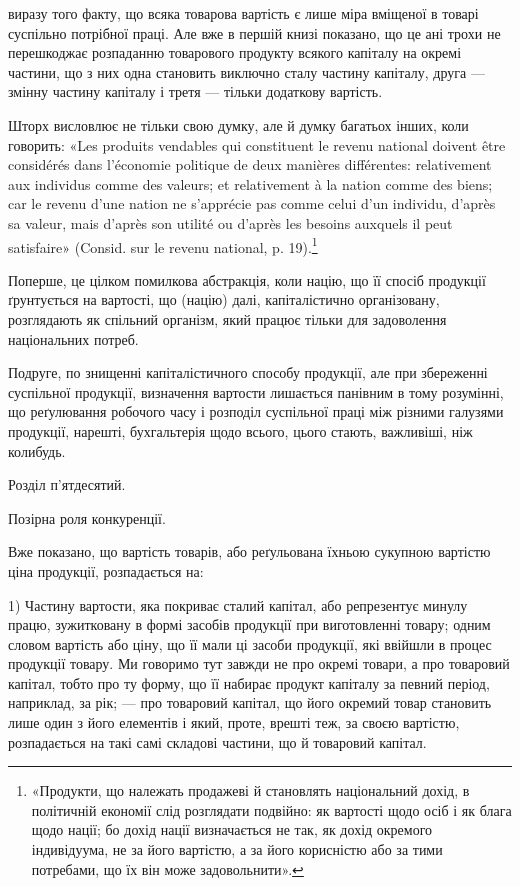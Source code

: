\parcont{}  %
виразу того факту, що всяка товарова вартість є лише міра вміщеної в товарі
суспільно потрібної праці. Але вже в першій книзі показано, що це ані трохи
не перешкоджає розпаданню товарового продукту всякого капіталу на окремі
частини, що з них одна становить виключно сталу частину капіталу, друга —
змінну частину капіталу і третя — тільки додаткову вартість.

Шторх висловлює не тільки свою думку, але й думку багатьох інших,
коли говорить: «Les produits vendables qui constituent le revenu national doivent
être considérés dans l’économie politique de deux manières différentes: relativement aux
individus comme des valeurs; et relativement à la nation comme des biens; car le
revenu d’une nation ne s’apprécie pas comme celui d’un individu, d’après sa valeur,
mais d’après son utilité ou d’après les besoins auxquels il peut satisfaire» (Consid.
sur le revenu national, p. 19).\footnote*{
«Продукти, що належать продажеві й становлять національний дохід, в політичній економії слід
розглядати подвійно: як вартості щодо осіб і як блага щодо нації; бо дохід нації визначається не
так, як дохід окремого індивідуума, не за його вартістю, а за його корисністю або за тими потребами,
що їх він може задовольнити».
}

Поперше, це цілком помилкова абстракція, коли націю, що її спосіб продукції
ґрунтується на вартості, що (націю) далі, капіталістично організовану,
розглядають як спільний організм, який працює тільки для задоволення національних
потреб.

Подруге, по знищенні капіталістичного способу продукції, але при збереженні
суспільної продукції, визначення вартости лишається панівним в тому
розумінні, що реґулювання робочого часу і розподіл суспільної праці між різними
галузями продукції, нарешті, бухгальтерія щодо всього, цього стають,
важливіші, ніж колибудь.

Розділ п’ятдесятий.

Позірна роля конкуренції.

Вже показано, що вартість товарів, або реґульована їхньою сукупною вартістю
ціна продукції, розпадається на:

1) Частину вартости, яка покриває сталий капітал, або репрезентує минулу
працю, зужитковану в формі засобів продукції при виготовленні товару; одним
словом вартість або ціну, що її мали ці засоби продукції, які ввійшли в процес
продукції товару. Ми говоримо тут завжди не про окремі товари, а про товаровий
капітал, тобто про ту форму, що її набирає продукт капіталу за певний
період, наприклад, за рік; — про товаровий капітал, що його окремий товар
становить лише один з його елементів і який, проте, врешті теж, за своєю
вартістю, розпадається на такі самі складові частини, що й товаровий капітал.

